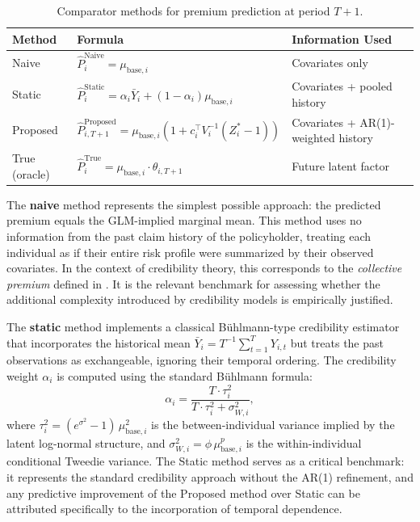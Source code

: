 \documentclass{sfuthesis}
\numberwithin{equation}{chapter}
\begin{document}
\begin{table}[htbp]
\centering
\caption{Comparator methods for premium prediction at period $T+1$.}
\label{tab:methods}
\begin{tabular}{@{}lll@{}}
\toprule
Method & Formula & Information Used \\
\midrule
Naive    & $\hat{P}^{\text{Naive}}_i = \mu_{\text{base}, i}$ & Covariates only \\
Static   & $\hat{P}^{\text{Static}}_i = \alpha_i \bar{Y}_i + (1-\alpha_i)\mu_{\text{base}, i}$ & Covariates + pooled history \\
Proposed & $\hat{P}^{\text{Proposed}}_{i, T+1} = \mu_{\text{base}, i}\!\left(1 + {c}_i^\top {V}_i^{-1}({Z}_i^* - {1})\right)$ & Covariates + AR(1)-weighted history \\
True (oracle) & $\hat{P}^{\text{True}}_i = \mu_{\text{base}, i} \cdot \theta_{i, T+1}$ & Future latent factor \\
\bottomrule
\end{tabular}
\end{table}

The \textbf{naive} method represents the simplest possible approach: the predicted premium equals the GLM-implied marginal mean. This method uses no information from the past claim history of the policyholder, treating each individual as if their entire risk profile were summarized by their observed covariates. In the context of credibility theory, this corresponds to the \emph{collective premium} defined in \citet[Chapter~1]{buhlmann2005course}. It is the relevant benchmark for assessing whether the additional complexity introduced by credibility models is empirically justified.

The \textbf{static} method implements a classical Bühlmann-type credibility estimator that incorporates the historical mean $\bar{Y}_i = T^{-1}\sum_{t=1}^T Y_{i,t}$ but treats the past observations as exchangeable, ignoring their temporal ordering. The credibility weight $\alpha_i$ is computed using the standard Bühlmann formula:
\begin{equation}
\alpha_i = \frac{T \cdot \tau_i^2}{T \cdot \tau_i^2 + \sigma_{W,i}^2},
\label{eq:bw}
\end{equation}
where $\tau_i^2 = (e^{\sigma^2} - 1)\,\mu_{\text{base}, i}^2$ is the between-individual variance implied by the latent log-normal structure, and $\sigma_{W,i}^2 = \phi\,\mu_{\text{base}, i}^p$ is the within-individual conditional Tweedie variance. The Static method serves as a critical benchmark: it represents the standard credibility approach without the AR(1) refinement, and any predictive improvement of the Proposed method over Static can be attributed specifically to the incorporation of temporal dependence.
\end{document}
